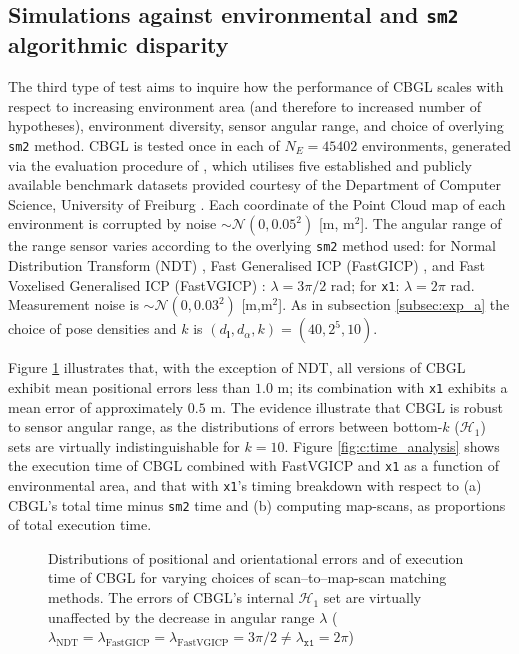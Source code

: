 \subsection{Simulations against environmental and \texttt{sm2} algorithmic disparity}
\label{subsec:exp_c}

The third type of test aims to inquire how the performance of CBGL scales with
respect to increasing environment area (and therefore to increased number of
hypotheses), environment diversity, sensor angular range, and choice of
overlying \texttt{sm2} method. CBGL is tested once in each of $N_E =
45402$ environments, generated via the evaluation procedure of
\cite{Filotheou2023a}, which utilises five established and publicly available
benchmark datasets provided courtesy of the Department of Computer Science,
University of Freiburg \cite{datasets_link}. Each coordinate of the Point Cloud
map of each environment is corrupted by noise $\sim\mathcal{N}(0,0.05^2)$ [m,
m$^2$].  The angular range of the range sensor varies according to the
overlying \texttt{sm2} method used: for Normal Distribution Transform (NDT)
\cite{ndt}, Fast Generalised ICP (FastGICP) \cite{fgi}, and Fast Voxelised
Generalised ICP (FastVGICP) \cite{fvg}: $\lambda = 3\pi/2$ rad; for
\texttt{x1}: $\lambda = 2\pi$ rad. Measurement noise is $\sim
\mathcal{N}(0,0.03^2)$ [m,m$^2$]. As in subsection \ref{subsec:exp_a} the
choice of pose densities and $k$ is $(d_{\bm{l}},d_{\alpha},k) = (40, 2^5,
10)$.

Figure \ref{fig:c:errors_and_time} illustrates that, with the exception of NDT,
all versions of CBGL exhibit mean positional errors less than $1.0$ m; its
combination with \texttt{x1} exhibits a mean error of approximately $0.5$ m.
The evidence illustrate that CBGL is robust to sensor angular range, as the
distributions of errors between bottom-$k$ ($\mathcal{H}_1$) sets are
virtually indistinguishable for $k=10$. Figure \ref{fig:c:time_analysis} shows
the execution time of CBGL combined with FastVGICP and \texttt{x1} as a
function of environmental area, and that with \texttt{x1}'s timing breakdown
with respect to (a) CBGL's total time minus \texttt{sm2} time and (b) computing
map-scans, as proportions of total execution time.

\begin{figure}
  \vspace{0.3cm}
  
  \vspace{0.1cm}
  \caption{\small Distributions of positional and orientational errors and of
           execution time of CBGL for varying choices of scan--to--map-scan
           matching methods. The errors of CBGL's internal $\mathcal{H}_1$ set
           are virtually unaffected by the decrease in angular range $\lambda$
           ($\lambda_{\text{NDT}} = \lambda_{\text{FastGICP}} =
           \lambda_{\text{FastVGICP}} = 3\pi/2 \neq \lambda_{\texttt{x1}} = 2\pi$)
           }
  \label{fig:c:errors_and_time}
\end{figure}

